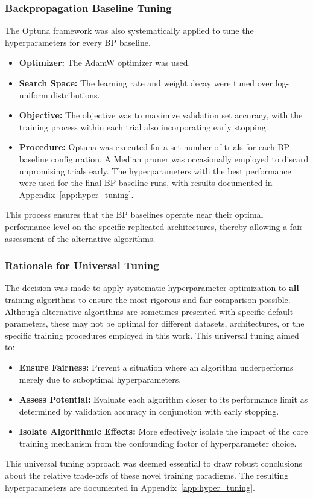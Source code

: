 \subsubsection{Backpropagation Baseline Tuning}
\label{subsec:methodology_hyper_bp}
The Optuna framework was also systematically applied to tune the hyperparameters for every BP baseline.
\begin{itemize}
    \item \textbf{Optimizer:} The AdamW optimizer \cite{loshchilov2017decoupled} was used.
    \item \textbf{Search Space:} The learning rate and weight decay were tuned over log-uniform distributions.
    \item \textbf{Objective:} The objective was to maximize validation set accuracy, with the training process within each trial also incorporating early stopping.
    \item \textbf{Procedure:} Optuna was executed for a set number of trials for each BP baseline configuration. A Median pruner was occasionally employed to discard unpromising trials early. The hyperparameters with the best performance were used for the final BP baseline runs, with results documented in Appendix~\ref{app:hyper_tuning}.
\end{itemize}
This process ensures that the BP baselines operate near their optimal performance level on the specific replicated architectures, thereby allowing a fair assessment of the alternative algorithms.

\subsubsection{Rationale for Universal Tuning}
\label{subsec:methodology_hyper_justification}
The decision was made to apply systematic hyperparameter optimization to \textbf{all} training algorithms to ensure the most rigorous and fair comparison possible. Although alternative algorithms are sometimes presented with specific default parameters, these may not be optimal for different datasets, architectures, or the specific training procedures employed in this work. This universal tuning aimed to:
\begin{itemize}
    \item \textbf{Ensure Fairness:} Prevent a situation where an algorithm underperforms merely due to suboptimal hyperparameters.
    \item \textbf{Assess Potential:} Evaluate each algorithm closer to its performance limit as determined by validation accuracy in conjunction with early stopping.
    \item \textbf{Isolate Algorithmic Effects:} More effectively isolate the impact of the core training mechanism from the confounding factor of hyperparameter choice.
\end{itemize}
This universal tuning approach was deemed essential to draw robust conclusions about the relative trade-offs of these novel training paradigms. The resulting hyperparameters are documented in Appendix~\ref{app:hyper_tuning}.

